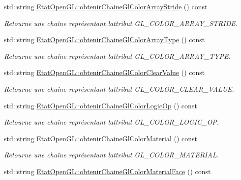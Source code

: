 \begin{DoxyCompactItemize}
std\+::string \hyperlink{group__utilitaire_gab499d52456b097364de8300cc6af6808}{Etat\+Open\+G\+L\+::obtenir\+Chaine\+Gl\+Color\+Array\+Stride} () const 
\begin{DoxyCompactList}\small\item\em Retourne une chaîne représentant l\textquotesingle{}attribut G\+L\+\_\+\+C\+O\+L\+O\+R\+\_\+\+A\+R\+R\+A\+Y\+\_\+\+S\+T\+R\+I\+D\+E. \end{DoxyCompactList}\item 
std\+::string \hyperlink{group__utilitaire_gae77f9acd8bdebe2e7bb39660e03b3e28}{Etat\+Open\+G\+L\+::obtenir\+Chaine\+Gl\+Color\+Array\+Type} () const 
\begin{DoxyCompactList}\small\item\em Retourne une chaîne représentant l\textquotesingle{}attribut G\+L\+\_\+\+C\+O\+L\+O\+R\+\_\+\+A\+R\+R\+A\+Y\+\_\+\+T\+Y\+P\+E. \end{DoxyCompactList}\item 
std\+::string \hyperlink{group__utilitaire_ga7de74c129bd5c5038e7f3d03a5508f72}{Etat\+Open\+G\+L\+::obtenir\+Chaine\+Gl\+Color\+Clear\+Value} () const 
\begin{DoxyCompactList}\small\item\em Retourne une chaîne représentant l\textquotesingle{}attribut G\+L\+\_\+\+C\+O\+L\+O\+R\+\_\+\+C\+L\+E\+A\+R\+\_\+\+V\+A\+L\+U\+E. \end{DoxyCompactList}\item 
std\+::string \hyperlink{group__utilitaire_gac48e5f8e10bfcd96670a537164a0a8ff}{Etat\+Open\+G\+L\+::obtenir\+Chaine\+Gl\+Color\+Logic\+Op} () const 
\begin{DoxyCompactList}\small\item\em Retourne une chaîne représentant l\textquotesingle{}attribut G\+L\+\_\+\+C\+O\+L\+O\+R\+\_\+\+L\+O\+G\+I\+C\+\_\+\+O\+P. \end{DoxyCompactList}\item 
std\+::string \hyperlink{group__utilitaire_gae53c823bf9d4e4305baf00f4d7da96af}{Etat\+Open\+G\+L\+::obtenir\+Chaine\+Gl\+Color\+Material} () const 
\begin{DoxyCompactList}\small\item\em Retourne une chaîne représentant l\textquotesingle{}attribut G\+L\+\_\+\+C\+O\+L\+O\+R\+\_\+\+M\+A\+T\+E\+R\+I\+A\+L. \end{DoxyCompactList}\item 
std\+::string \hyperlink{group__utilitaire_gaec66f0ae860a11d50b0e1cf2def483bf}{Etat\+Open\+G\+L\+::obtenir\+Chaine\+Gl\+Color\+Material\+Face} () const 

\end{DoxyCompactItemize}
